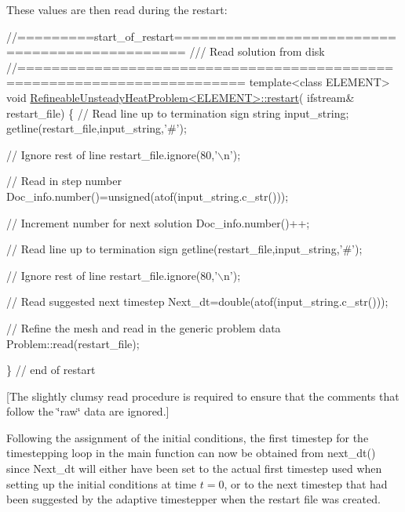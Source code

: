 These values are then read during the restart\+:

 
\begin{DoxyCodeInclude}
\textcolor{comment}{//=========start\_of\_restart===============================================}
\textcolor{comment}{/// Read solution from disk}
\textcolor{comment}{}\textcolor{comment}{//========================================================================}
\textcolor{keyword}{template}<\textcolor{keyword}{class} ELEMENT>
\textcolor{keywordtype}{void} \hyperlink{classRefineableUnsteadyHeatProblem_af36fa71e72852367411e21b50b179625}{RefineableUnsteadyHeatProblem<ELEMENT>::restart}(
      ifstream& restart\_file)
\{
 \textcolor{comment}{// Read line up to termination sign}
 \textcolor{keywordtype}{string} input\_string;
 getline(restart\_file,input\_string,\textcolor{charliteral}{'#'});

 \textcolor{comment}{// Ignore rest of line}
 restart\_file.ignore(80,\textcolor{charliteral}{'\(\backslash\)n'});

 \textcolor{comment}{// Read in step number}
 Doc\_info.number()=unsigned(atof(input\_string.c\_str()));

 \textcolor{comment}{// Increment number for next solution}
 Doc\_info.number()++;

 \textcolor{comment}{// Read line up to termination sign}
 getline(restart\_file,input\_string,\textcolor{charliteral}{'#'});

 \textcolor{comment}{// Ignore rest of line}
 restart\_file.ignore(80,\textcolor{charliteral}{'\(\backslash\)n'});

 \textcolor{comment}{// Read suggested next timestep}
 Next\_dt=double(atof(input\_string.c\_str()));

 \textcolor{comment}{// Refine the mesh and read in the generic problem data}
 Problem::read(restart\_file);

\} \textcolor{comment}{// end of restart}

\end{DoxyCodeInclude}


\mbox{[}The slightly clumsy read procedure is required to ensure that the comments that follow the \char`\"{}raw\char`\"{} data are ignored.\mbox{]}

Following the assignment of the initial conditions, the first timestep for the timestepping loop in the {\ttfamily main} function can now be obtained from {\ttfamily next\+\_\+dt()} since {\ttfamily Next\+\_\+dt} will either have been set to the actual first timestep used when setting up the initial conditions at time $ t=0$, or to the next timestep that had been suggested by the adaptive timestepper when the restart file was created.

